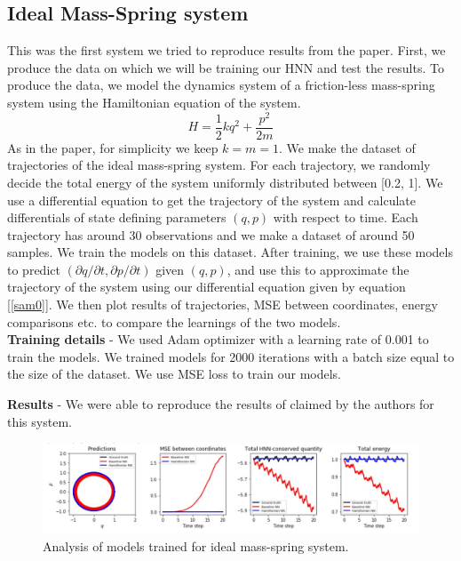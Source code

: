\subsection{Ideal Mass-Spring system}
This was the first system we tried to reproduce results from the paper. First, we produce the data on which we will be training our HNN and test the results. To produce the data, we model the dynamics system of a friction-less mass-spring system using the Hamiltonian equation of the system.
\begin{equation}
H = \frac{1}{2}kq^2 + \frac{p^2}{2m}
\end{equation}
As in the paper, for simplicity we keep \(k = m = 1\). We make the dataset of trajectories of the ideal mass-spring system. For each trajectory, we randomly decide the total energy of the system uniformly distributed between [0.2, 1]. We use a differential equation to get the trajectory of the system and calculate differentials of state defining parameters \((q, p)\) with respect to time. Each trajectory has around 30 observations and we make a dataset of around 50 samples. We train the models on this dataset. After training, we use these models to predict \((\partial q/\partial t, \partial p/\partial t)\) given \((q, p)\), and use this to approximate the trajectory of the system using our differential equation given by equation [\ref{sam0}]. We then plot results of trajectories, MSE between coordinates, energy comparisons etc. to compare the learnings of the two models.\\
\textbf{Training details} - We used Adam optimizer \cite{kingma2014adam} with a learning rate of 0.001 to train the models. We trained models for 2000 iterations with a batch size equal to the size of the dataset. We use MSE loss to train our models.

\textbf{Results} - We were able to reproduce the results of claimed by the authors for this system.
\begin{figure}[htp]
    \centering
    \includegraphics[width=15cm]{../openreview/download.png}
    \caption{Analysis of models trained for ideal mass-spring system.}
    \label{fig:galaxy}
\end{figure}

